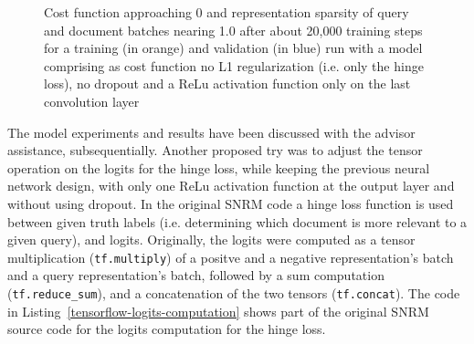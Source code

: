 \begin{figure}[htbp]
\centering
\begin{subfigure}[b]{0.96\textwidth}
    \centering
    \label{fig:2020-01-24:cost-fn}
\end{subfigure}
\begin{subfigure}[b]{0.45\textwidth}
    \centering
    \label{fig:2020-01-24:sparsity-query-repr}
\end{subfigure}
\hspace{0.042\textwidth}
\begin{subfigure}[b]{0.45\textwidth}
    \centering
    \label{fig:2020-01-24:sparsity-doc-repr}
\end{subfigure}
\caption[Costs function and representation sparsity for a run without L1 regularization, without dropout and ReLu only on the last layer]{Cost function approaching 0 and representation sparsity of query and document batches nearing 1.0 after about 20,000 training steps for a training (in orange) and validation (in blue) run with a model comprising as cost function no L1 regularization (i.e. only the hinge loss), no dropout and a ReLu activation function only on the last convolution layer}
\label{fig:2020-01-24:cost-fn-query-doc-repr-sparsity} %
\end{figure}

The model experiments and results have been discussed with the advisor assistance, subsequentially.
Another proposed try was to adjust the tensor operation on the logits for the hinge loss,
    while keeping the previous neural network design, with only one ReLu activation function at the output layer and
    without using dropout.
In the original SNRM code a hinge loss function is used between given truth labels
    (i.e. determining which document is more relevant to a given query),
    and logits.
Originally, the logits were computed as a tensor multiplication (\texttt{tf.multiply}) of 
    a positve and a negative representation's batch and a query representation's batch,
    followed by a sum computation (\texttt{tf.reduce\_sum}), 
    and a concatenation of the two tensors (\texttt{tf.concat}).
The code in Listing~\ref{tensorflow-logits-computation} shows part of the original SNRM source code for the 
    logits computation for the hinge loss.

